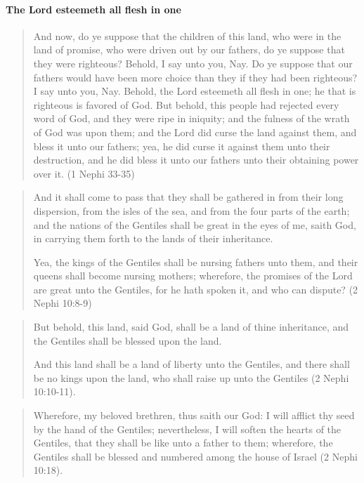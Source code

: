 \paragraph{The Lord esteemeth all flesh in one}
\begin{quotation}
And now, do ye suppose that the children of this land, who were in the land of promise, who were driven out by our fathers, do ye suppose that they were righteous? Behold, I say unto you, Nay. Do ye suppose that our fathers would have been more choice than they if they had been righteous? I say unto you, Nay. Behold, the Lord esteemeth all flesh in one; he that is righteous is favored of God. But behold, this people had rejected every word of God, and they were ripe in iniquity; and the fulness of the wrath of God was upon them; and the Lord did curse the land against them, and bless it unto our fathers; yea, he did curse it against them unto their destruction, and he did bless it unto our fathers unto their obtaining power over it. (1 Nephi 33-35)
\end{quotation}

\begin{quotation}
And it shall come to pass that they shall be gathered in from their long dispersion, from the isles of the sea, and from the four parts of the earth; and the nations of the Gentiles shall be great in the eyes of me, saith God, in carrying them forth to the lands of their inheritance.

Yea, the kings of the Gentiles shall be nursing fathers unto them, and their queens shall become nursing mothers; wherefore, the promises of the Lord are great unto the Gentiles, for he hath spoken it, and who can dispute? (2 Nephi 10:8-9)
\end{quotation}

\begin{quotation}
But behold, this land, said God, shall be a land of thine inheritance, and the Gentiles shall be blessed upon the land.

And this land shall be a land of liberty unto the Gentiles, and there shall be no kings upon the land, who shall raise up unto the Gentiles (2 Nephi 10:10-11).
\end{quotation}

\begin{quotation}
Wherefore, my beloved brethren, thus saith our God: I will afflict thy seed by the hand of the Gentiles; nevertheless, I will soften the hearts of the Gentiles, that they shall be like unto a father to them; wherefore, the Gentiles shall be blessed and numbered among the house of Israel (2 Nephi 10:18).
\end{quotation}


